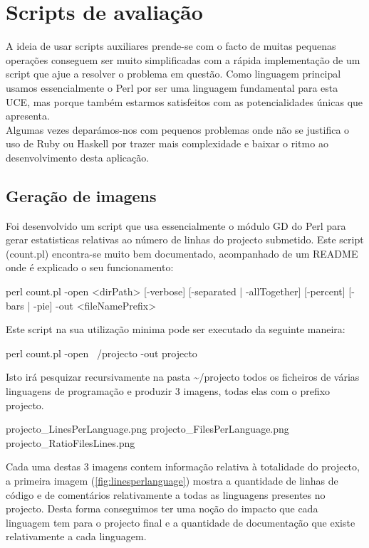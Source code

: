 \chapter{Scripts de avaliação}
\minitoc

A ideia de usar scripts auxiliares prende-se com o facto de muitas pequenas operações conseguem ser muito simplificadas com a rápida implementação
de um script que ajue a resolver o problema em questão. Como linguagem principal usamos essencialmente o \textrm{Perl} por ser uma linguagem fundamental para esta \textrm{UCE},
mas porque também estarmos satisfeitos com as potencialidades únicas que apresenta.\\
Algumas vezes deparámos-nos com pequenos problemas onde não se justifica o uso de \textrm{Ruby} ou \textrm{Haskell} por trazer mais complexidade e baixar o ritmo ao
desenvolvimento desta aplicação.

\section{Geração de imagens}\label{sec geraimg}
Foi desenvolvido um script que usa essencialmente o módulo \textrm{GD} do \textrm{Perl} para gerar estatisticas relativas ao número de linhas do projecto submetido.
Este script (count.pl) encontra-se muito bem documentado, acompanhado de um \textrm{README} onde é explicado o seu funcionamento:

\begin{code_files}
perl count.pl -open <dirPath> [-verbose] [-separated | -allTogether]
    [-percent] [-bars | -pie] -out <fileNamePrefix>
\end{code_files}

Este script na sua utilização minima pode ser executado da seguinte maneira:
\begin{code_files}
perl count.pl -open ~/projecto -out projecto
\end{code_files}

Isto irá pesquizar recursivamente na pasta \textrm{\textasciitilde{}/projecto} todos os ficheiros de várias linguagens de programação e produzir $3$ imagens, todas elas com o
prefixo \textrm{projecto}.

\begin{code_files}
projecto_LinesPerLanguage.png
projecto_FilesPerLanguage.png
projecto_RatioFilesLines.png
\end{code_files}

Cada uma destas $3$ imagens contem informação relativa à totalidade do projecto, a primeira imagem (\ref{fig:linesperlanguage}) mostra a quantidade de linhas
de código e de comentários relativamente a todas as linguagens presentes no projecto. Desta forma conseguimos ter uma noção do impacto que cada linguagem
tem para o projecto final e a quantidade de documentação que existe relativamente a cada linguagem.

